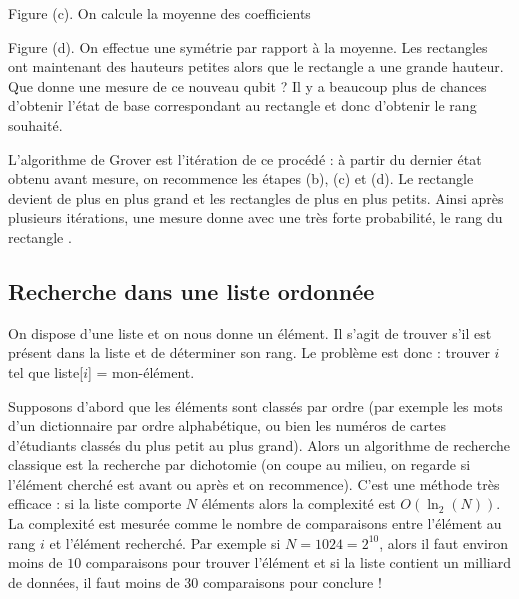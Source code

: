 \documentclass[11pt,class=report,crop=false]{standalone}
\begin{document}
\smallskip

Figure (c). On calcule la moyenne des coefficients

\smallskip

Figure (d). On effectue une symétrie par rapport à la moyenne. Les rectangles  ont maintenant des hauteurs petites alors que le rectangle  a une grande hauteur. Que donne une mesure de ce nouveau qubit ? Il y a beaucoup plus de chances d'obtenir l'état de base correspondant au rectangle  et donc d'obtenir le rang souhaité.

\smallskip

L'algorithme de Grover est l'itération de ce procédé : à partir du dernier état obtenu avant mesure, on recommence les étapes (b), (c) et (d). Le rectangle  devient de plus en plus grand et les rectangles  de plus en plus petits. Ainsi après plusieurs itérations, une mesure donne avec une très forte probabilité, le rang du rectangle .


\subsection{Recherche dans une liste ordonnée}

On dispose d'une liste et on nous donne un élément. Il s'agit de trouver s'il est présent dans la liste et de déterminer son rang. Le problème est donc : trouver $i$ tel que liste[$i$] = mon-élément.

Supposons d'abord que les éléments sont classés par ordre (par exemple les mots d'un dictionnaire par ordre alphabétique, ou bien les numéros de cartes d'étudiants classés du plus petit au plus grand). 
Alors un algorithme de recherche classique est la recherche par dichotomie (on coupe au milieu, on regarde si l'élément cherché est avant ou après et on recommence). C'est une méthode très efficace : si la liste comporte $N$ éléments alors la complexité est
$O( \ln_2(N) )$. La complexité est mesurée comme le nombre de comparaisons entre l'élément au rang $i$ et l'élément recherché.
Par exemple si $N=1024=2^{10}$, alors il faut environ moins de $10$ comparaisons pour trouver l'élément et si la liste contient un milliard de données, il faut moins de $30$ comparaisons pour conclure !



\end{document}
